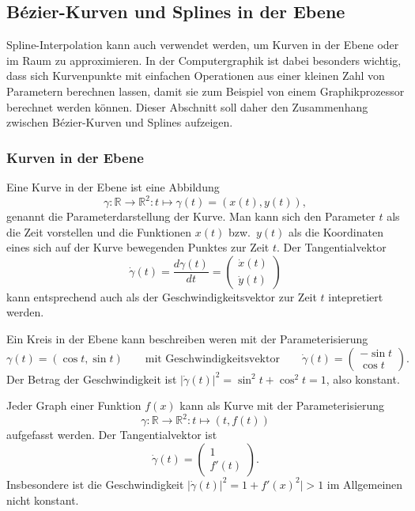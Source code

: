 %
%
%

\subsection{Bézier-Kurven und Splines in der Ebene
\label{buch:subsection:bezier}}
%
%
Spline-Interpolation kann auch verwendet werden, um Kurven in der Ebene
oder im Raum zu approximieren.
In der Computergraphik ist dabei besonders wichtig, dass sich Kurvenpunkte
mit einfachen Operationen aus einer kleinen Zahl von Parametern berechnen
lassen, damit sie zum Beispiel von einem Graphikprozessor berechnet
werden können.
%
%
Dieser Abschnitt soll daher den Zusammenhang zwischen Bézier-Kurven und
Splines aufzeigen.

%
%
\subsubsection{Kurven in der Ebene}
Eine Kurve in der Ebene ist eine Abbildung
\[
\gamma \colon \mathbb R \to \mathbb R^2 : t \mapsto \gamma(t) = (x(t),y(t)),
\]
genannt die Parameterdarstellung der Kurve.
%
%
Man kann sich den Parameter $t$ als die Zeit vorstellen und die Funktionen
$x(t)$ bzw.~$y(t)$ als die Koordinaten eines sich auf der Kurve bewegenden
Punktes zur Zeit $t$.
Der Tangentialvektor
%
\[
\dot{\gamma}(t)
=
\frac{d\gamma(t)}{dt}
=
\begin{pmatrix}
\dot{x}(t)\\\dot{y}(t)
\end{pmatrix}
\]
kann entsprechend auch als der Geschwindigkeitsvektor zur Zeit $t$ 
intepretiert werden.
%
%

\begin{beispiel}
Ein Kreis in der Ebene kann beschreiben weren mit der Parameterisierung
\[
\gamma(t) = (\cos t, \sin t)
\qquad
\text{mit Geschwindigkeitsvektor}
\qquad
\dot{\gamma}(t)
=
\begin{pmatrix}
-\sin t\\\cos t
\end{pmatrix}.
\]
Der Betrag der Geschwindigkeit ist $|\dot{\gamma}(t)|^2=\sin^2t+\cos^2t=1$,
also konstant.
\end{beispiel}

\begin{beispiel}
Jeder Graph einer Funktion $f(x)$ kann als Kurve mit der Parameterisierung
\[
\gamma \colon \mathbb R\to\mathbb R^2 : t \mapsto (t, f(t))
\]
aufgefasst werden.
Der Tangentialvektor ist
\[
\dot{\gamma}(t)
=
\begin{pmatrix}
1\\f'(t)
\end{pmatrix}.
\]
Insbesondere ist die Geschwindigkeit $|\dot{\gamma}(t)|^2=1+f'(x)^2|>1$
im Allgemeinen nicht konstant.
\end{beispiel}


